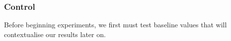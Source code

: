 \subsubsection{Control}
Before beginning experiments, we first must test baseline values that will contextualise our results later on.
